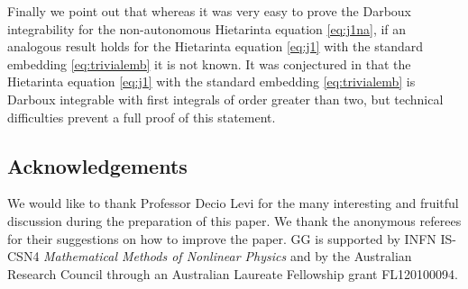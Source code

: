 \documentclass[pdftex]{sigma}
\numberwithin{equation}{section}
\begin{document}
Finally we point out that whereas it was very easy
to prove the Darboux integrability for the non-autonomous
Hietarinta equation \eqref{eq:j1na}, if an analogous
result holds for the Hietarinta equation \eqref{eq:j1}
with the standard embedding \eqref{eq:trivialemb} it is not known.
It was conjectured in \cite{GubbiottiPhD2017} that
the Hietarinta equation \eqref{eq:j1} with the standard embedding
\eqref{eq:trivialemb} is Darboux integrable with
f\/irst integrals of order greater than two,
but technical dif\/f\/iculties prevent a full proof
of this statement.

\subsection*{Acknowledgements}

We would like to thank Professor Decio Levi for the many interesting and fruitful discussion during the preparation of this paper. We thank the anonymous referees for their suggestions on how to improve the paper.
GG is supported by INFN IS-CSN4 \emph{Mathematical Methods of Nonlinear Physics} and by the Australian Research Council through an Australian Laureate Fellowship grant FL120100094.
\end{document}
